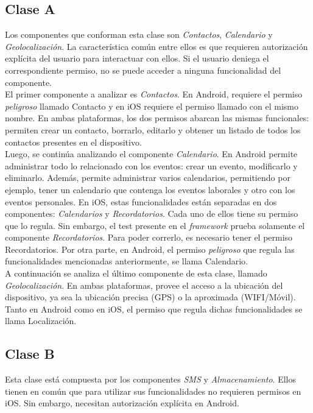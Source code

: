 \subsection{Clase A}
Los componentes que conforman esta clase son \emph{Contactos}, \emph{Calendario} y \emph{Geolocalización}. La característica común entre ellos es que requieren autorización explícita del usuario para interactuar con ellos. Si el usuario deniega el correspondiente permiso, no se puede acceder a ninguna funcionalidad del componente.\\

El primer componente a analizar es \emph{Contactos}. En Android, requiere el permiso \textit{peligroso} llamado Contacto y en iOS requiere el permiso llamado con el mismo nombre. En ambas plataformas, los dos permisos abarcan las mismas funcionales: permiten crear un contacto, borrarlo, editarlo y obtener un listado de todos los contactos presentes en el dispositivo.\\

Luego, se continúa analizando el componente \emph{Calendario}. En Android permite administrar todo lo relacionado con los eventos: crear un evento, modificarlo y eliminarlo. Además, permite administrar varios calendarios, permitiendo por ejemplo, tener un calendario que contenga los eventos laborales y otro con los eventos personales. En iOS, estas funcionalidades están separadas en dos componentes: \emph{Calendarios} y \emph{Recordatorios}. Cada uno de ellos tiene su permiso que lo regula. Sin embargo, el test presente en el \textit{framework} prueba solamente el componente \emph{Recordatorios}. Para poder correrlo, es necesario tener el permiso Recordatorios. Por otra parte, en Android, el permiso \textit{peligroso} que regula las funcionalidades mencionadas anteriormente, se llama Calendario.\\

A continuación se analiza el último componente de esta clase, llamado \emph{Geolocalización}. En ambas plataformas, provee el acceso a la ubicación del dispositivo, ya sea la ubicación precisa (GPS) o la aproximada (WIFI/Móvil). Tanto en Android como en iOS, el permiso que regula dichas funcionalidades se llama Localización.
\subsection{Clase B}
Esta clase está compuesta por los componentes \emph{SMS} y \emph{Almacenamiento}. Ellos tienen en común que para utilizar sus funcionalidades no requieren permisos en iOS. Sin embargo, necesitan autorización explícita en Android.\\

